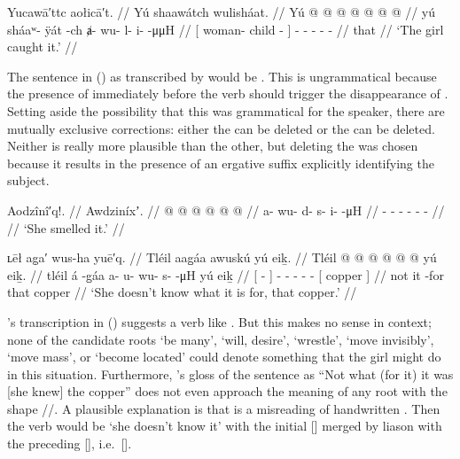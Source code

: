 \ex\label{ex:89-156-girl-caught-it}%
%
\begingl
	\glpreamble	Yucawā′ttc aołicā′t. //
	\glpreamble	Yú shaawátch wulisháat. //
	\gla	{} Yú  @ {} @ {} {}
		 @ {} @ {} @ {} @ {} @ {} //
	\glb	{} yú sháaʷ- ÿát -ch {}
		ⱥ- wu- l- i-  -μμH //
	\glc	{}[  woman- child - {}]
		- - - -  - //
	\gld	{} that  {} {} {}
		 {} {} {} {} {} //
	\glft	‘The girl caught it.’
		//
\endgl
\xe

The sentence in (\lastx) as transcribed by \citeauthor{swanton:1909} would be .
This is ungrammatical because the presence of  immediately before the verb should trigger the disappearance of .
Setting aside the possibility that this was grammatical for the speaker, there are mutually exclusive corrections: either the  can be deleted or the  can be deleted.
Neither is really more plausible than the other, but deleting the  was chosen because it results in the presence of an ergative suffix explicitly identifying the subject.

\ex\label{ex:89-157-she-smelled-it}%
%
\begingl
	\glpreamble	Aodzînî′q!. //
	\glpreamble	Awdziníxʼ. //
	\gla	{} @ {} @ {} @ {} @ {} @ {} @ {} //
	\glb	a- wu- d- s- i-  -μH //
	\glc	{}- - - - -  - //
	\gld	{} {} {} {} {} {} {} //
	\glft	‘She smelled it.’
		//
\endgl
\xe

\ex\label{ex:89-158-doesnt-know-it}%
%
\begingl
	\glpreamble	ʟēł ag̣a′ wus-ha yuē′q. //
	\glpreamble	Tléil aag̱áa awuskú yú eiḵ. //
	\gla	Tléil {}  @ {} {}
		 @ {} @ {} @ {} @ {} @ {}
		{} yú eiḵ. {} //
	\glb	tléil {} á -g̱áa {}
		a- u- wu- s-  -μH
		{} yú eiḵ {} //
	\glc	{} {}[  - {}]
		- - - -  -
		{}[  copper {}] //
	\gld	not {} it -for {}
		 {} {} {} {} {}
		{} that copper {} //
	\glft	‘She doesn’t know what it is for, that copper.’
		//
\endgl
\xe

\citeauthor{swanton:1909}’s transcription  in (\lastx) suggests a verb like .
But this makes no sense in context; none of the candidate roots  ‘be many’,  ‘will, desire’,  ‘wrestle’,  ‘move invisibly’,  ‘move mass’, or  ‘become located’ could denote something that the girl might do in this situation.
Furthermore, \citeauthor{swanton:1909}’s gloss of the sentence as “Not what (for it) it was [she knew] the copper” does not even approach the meaning of any root with the shape //.
A plausible explanation is that  is a misreading of handwritten .
Then the verb would be  ‘she doesn’t know it’ with the initial [] merged by liason with the preceding [], i.e.\ [].

